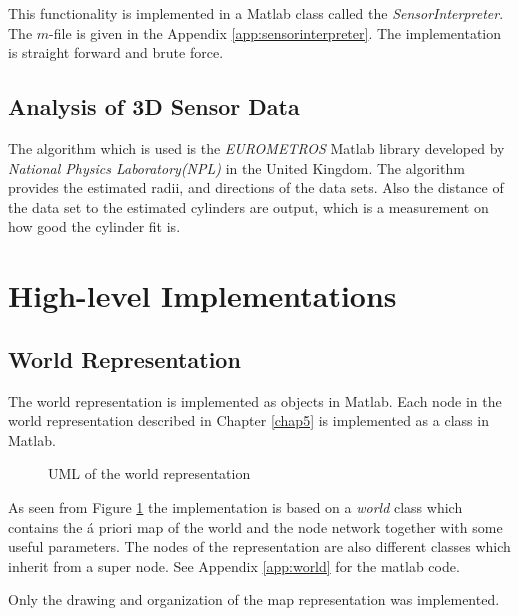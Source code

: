 This functionality is implemented in a Matlab class called the \emph{SensorInterpreter}.
The $m$-file is given in the Appendix \ref{app:sensorinterpreter}. The implementation is
straight forward and brute force. 


\subsection{Analysis of 3D Sensor Data}
The algorithm which is used is the \emph{EUROMETROS}\cite{eurometros} Matlab library developed by
\emph{National Physics Laboratory(NPL)} in the United Kingdom. The algorithm provides the
estimated radii, and directions of the data sets. Also the distance of the data set to the
estimated cylinders are output, which is a measurement on how good the cylinder fit is. 


\section{High-level Implementations}

\subsection{World Representation}
The world representation is implemented as objects in Matlab. Each node in the world
representation described in Chapter \ref{chap5} is implemented as a class in Matlab. 
\begin{figure}[htbp]
    \centering
    \caption{UML of the world representation}
    \label{chap6:fig-world-uml}
\end{figure}

As seen from Figure \ref{chap6:fig-world-uml} the implementation is based on a
\emph{world} class which contains the á priori map of the world and the node network
together with some useful parameters. The nodes of the representation are also different
classes which inherit from a super node. See Appendix \ref{app:world} for the matlab
code. 

Only the drawing and organization of the map representation was implemented.


